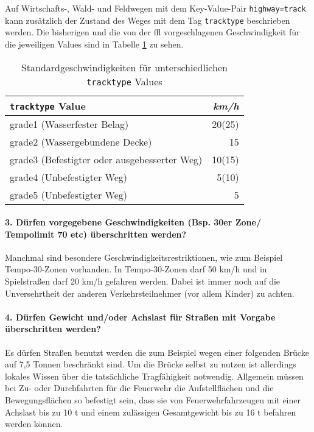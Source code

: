 Auf Wirtschafts-, Wald- und Feldwegen mit dem Key-Value-Pair \texttt{highway=track} kann zusätzlich der Zustand des Weges mit dem Tag \texttt{tracktype} beschrieben werden.
Die bisherigen und die von der \gls{ffl} vorgeschlagenen Geschwindigkeit für die jeweiligen Values sind in Tabelle \ref{tab:speedinfotrack} zu sehen.

\begin{table}[h]
\centering
\caption{Standardgeschwindigkeiten für unterschiedlichen \texttt{tracktype} Values}
\label{tab:speedinfotrack}
\begin{tabular}{|l|r|}
\hline
\texttt{tracktype} Value & \textit{km/h} \\
\hline
grade1 (Wasserfester Belag) & 20(25)   \\
grade2 (Wassergebundene Decke) & 15  \\
grade3 (Befestigter oder ausgebesserter Weg) & 10(15)  \\
grade4 (Unbefestigter Weg) & 5(10)   \\
grade5 (Unbefestigter Weg) & 5   \\
\hline
\end{tabular}
\end{table}

\paragraph*{3. Dürfen vorgegebene Geschwindigkeiten (Bsp. 30er Zone/ Tempolimit 70 etc) überschritten werden?}
\label{frage3}
\par
Manchmal sind besondere Geschwindigkeitsrestriktionen, wie zum Beispiel Tempo-30-Zonen vorhanden.
In Tempo-30-Zonen darf 50 km/h und in Spielstraßen darf 20 km/h gefahren werden.
Dabei ist immer noch auf die Unversehrtheit der anderen Verkehrsteilnehmer (vor allem Kinder) zu achten.

\paragraph*{4. Dürfen Gewicht und/oder Achslast für Straßen mit Vorgabe überschritten werden?}
\label{frage4}
\par
Es dürfen Straßen benutzt werden die zum Beispiel wegen einer folgenden Brücke auf 7,5 Tonnen beschränkt sind.
Um die Brücke selbst zu nutzen ist allerdings lokales Wissen über die tatsächliche Tragfähigkeit notwendig.
Allgemein müssen bei Zu- oder Durchfahrten für die Feuerwehr die Aufstellflächen und die Bewegungsflächen so befestigt sein, dass sie von Feuerwehrfahrzeugen mit einer Achslast bis zu 10 t und einem zulässigen Gesamtgewicht bis zu 16 t befahren werden können.

